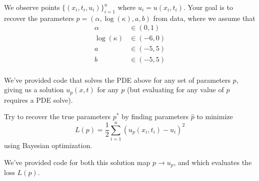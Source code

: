 \documentclass[11pt]{article}
\begin{document}
We observe points $\{(x_i,t_i,u_i)\}_{i=1}^n$ where $u_i = u(x_i,t_i)$. 
Your goal is to recover the parameters $p = (\alpha,\log(\kappa),a,b)$ from data, 
where we assume that 
\begin{align}
    \alpha &\in (0,1) \\
    \log(\kappa) &\in (-6,0) \\
    a &\in (-5,5) \\
    b &\in (-5,5) \\
\end{align}

We've provided code that solves the PDE above for any set of parameters $p$, giving 
us a solution $u_p(x,t)$ for any $p$ (but evaluating for any value of $p$ requires a PDE solve). 

Try to recover the true parameters $p^*$ by finding parameters $\hat{p}$ to minimize 
\begin{equation}
    L(p) = \frac{1}{2}\sum_{i=1}^n (u_p(x_i,t_i) - u_i)^2
\end{equation}
using Bayesian optimization. 

We've provided code for both this solution map $p\to u_p$, and which evaluates the loss 
$L(p)$.  
\end{document}
